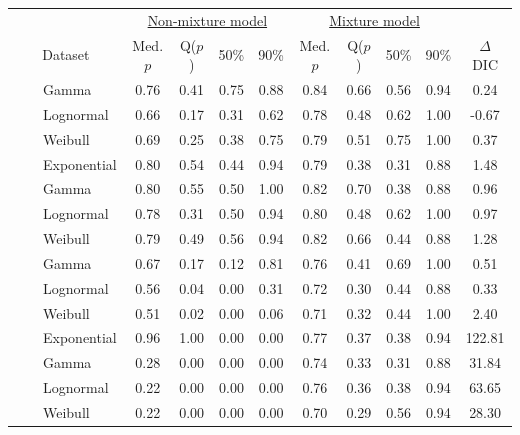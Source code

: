 \documentclass[useAMS,usenatbib,referee,12pt]{article}
\begin{document}
\begin{table}[ht]\centering\small
\begin{tabular}{ll|l|cccc|cccc||c}
 \multicolumn{3}{c|}{ } & \multicolumn{4}{c|}{\underline{Non-mixture model}} & \multicolumn{4}{c||}{\underline{Mixture model}} & \\
 \multicolumn{3}{c|}{Dataset} & Med. $p$ & Q($p$) & 50\% & 90\% & Med. $p$ & Q($p$) & 50\% & 90\% & $\Delta$ DIC \\ 
  \hline
  \hline
 \parbox[t]{2mm}{} & \parbox[t]{2mm}{} & Gamma & 0.76 & 0.41 & 0.75 & 0.88 & 0.84 & 0.66 & 0.56 & 0.94 & 0.24 \\ 
 & &   Lognormal & 0.66 & 0.17 & 0.31 & 0.62 & 0.78 & 0.48 & 0.62 & 1.00 & -0.67 \\ 
 & &   Weibull & 0.69 & 0.25 & 0.38 & 0.75 & 0.79 & 0.51 & 0.75 & 1.00 & 0.37 \\ 
 & &   Exponential & 0.80 & 0.54 & 0.44 & 0.94 & 0.79 & 0.38 & 0.31 & 0.88 & 1.48 \\ 
 & \parbox[t]{2mm}{} &  Gamma & 0.80 & 0.55 & 0.50 & 1.00 & 0.82 & 0.70 & 0.38 & 0.88 & 0.96 \\ 
 & &   Lognormal & 0.78 & 0.31 & 0.50 & 0.94 & 0.80 & 0.48 & 0.62 & 1.00 & 0.97 \\ 
 & &   Weibull & 0.79 & 0.49 & 0.56 & 0.94 & 0.82 & 0.66 & 0.44 & 0.88 & 1.28 \\ 
  \hline
\parbox[t]{2mm}{} & \parbox[t]{2mm}{} & Gamma & 0.67 & 0.17 & 0.12 & 0.81 & 0.76 & 0.41 & 0.69 & 1.00 & 0.51 \\ 
 & &   Lognormal & 0.56 & 0.04 & 0.00 & 0.31 & 0.72 & 0.30 & 0.44 & 0.88 & 0.33 \\ 
 & &   Weibull & 0.51 & 0.02 & 0.00 & 0.06 & 0.71 & 0.32 & 0.44 & 1.00 & 2.40 \\ 
 & &   Exponential & 0.96 & 1.00 & 0.00 & 0.00 & 0.77 & 0.37 & 0.38 & 0.94 & 122.81 \\ 
 & \parbox[t]{2mm}{} & Gamma & 0.28 & 0.00 & 0.00 & 0.00 & 0.74 & 0.33 & 0.31 & 0.88 & 31.84 \\ 
 & &   Lognormal & 0.22 & 0.00 & 0.00 & 0.00 & 0.76 & 0.36 & 0.38 & 0.94 & 63.65 \\ 
 & &   Weibull & 0.22 & 0.00 & 0.00 & 0.00 & 0.70 & 0.29 & 0.56 & 0.94 & 28.30 \\ 

\end{tabular}
\end{table}
\end{document}
